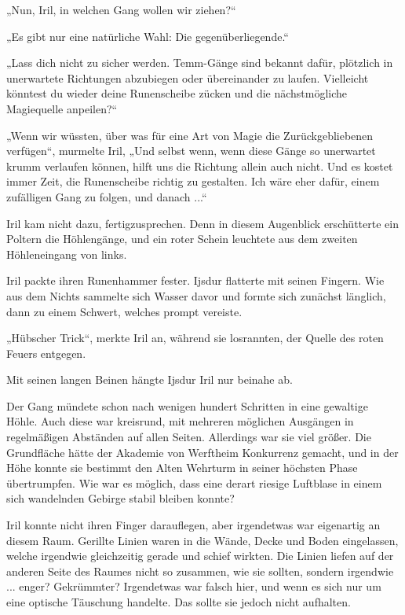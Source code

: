 „Nun, Iril, in welchen Gang wollen wir ziehen?“

„Es gibt nur eine natürliche Wahl: Die gegenüberliegende.“

„Lass dich nicht zu sicher werden. Temm-Gänge sind bekannt dafür, plötzlich in unerwartete Richtungen abzubiegen oder übereinander zu laufen. Vielleicht könntest du wieder deine Runenscheibe zücken und die nächstmögliche Magiequelle anpeilen?“

„Wenn wir wüssten, über was für eine Art von Magie die Zurückgebliebenen verfügen“, murmelte Iril, „Und selbst wenn, wenn diese Gänge so unerwartet krumm verlaufen können, hilft uns die Richtung allein auch nicht. Und es kostet immer Zeit, die Runenscheibe richtig zu gestalten. Ich wäre eher dafür, einem zufälligen Gang zu folgen, und danach ...“

Iril kam nicht dazu, fertigzusprechen. Denn in diesem Augenblick erschütterte ein Poltern die Höhlengänge, und ein roter Schein leuchtete aus dem zweiten Höhleneingang von links.

Iril packte ihren Runenhammer fester. Ijsdur flatterte mit seinen Fingern. Wie aus dem Nichts sammelte sich Wasser davor und formte sich zunächst länglich, dann zu einem Schwert, welches prompt vereiste.

„Hübscher Trick“, merkte Iril an, während sie losrannten, der Quelle des roten Feuers entgegen.

Mit seinen langen Beinen hängte Ijsdur Iril nur beinahe ab.\bigskip







Der Gang mündete schon nach wenigen hundert Schritten in eine gewaltige Höhle. Auch diese war kreisrund, mit mehreren möglichen Ausgängen in regelmäßigen Abständen auf allen Seiten. Allerdings war sie viel größer. Die Grundfläche hätte der Akademie von Werftheim Konkurrenz gemacht, und in der Höhe konnte sie bestimmt den Alten Wehrturm in seiner höchsten Phase übertrumpfen. Wie war es möglich, dass eine derart riesige Luftblase in einem sich wandelnden Gebirge stabil bleiben konnte?

Iril konnte nicht ihren Finger darauflegen, aber irgendetwas war eigenartig an diesem Raum. Gerillte Linien waren in die Wände, Decke und Boden eingelassen, welche irgendwie gleichzeitig gerade und schief wirkten. Die Linien liefen auf der anderen Seite des Raumes nicht so zusammen, wie sie sollten, sondern irgendwie ... enger? Gekrümmter? Irgendetwas war falsch hier, und wenn es sich nur um eine optische Täuschung handelte. Das sollte sie jedoch nicht aufhalten.

